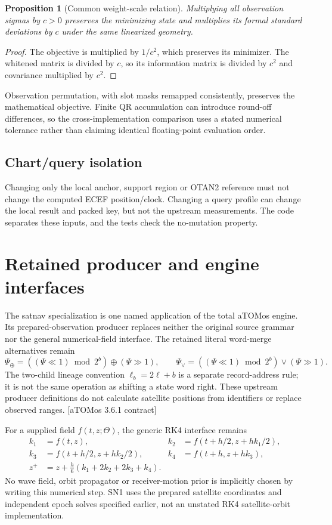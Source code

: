 \documentclass[11pt,a4paper]{article}
\newcommand{\aRef}{\textcolor{muted}{[aTOMos 3.6.1 contract]}}
\newtheorem{proposition}{Proposition}[section]
\begin{document}
\begin{proposition}[Common weight-scale relation]
Multiplying all observation sigmas by $c>0$ preserves the minimizing state and multiplies its formal
standard deviations by $c$ under the same linearized geometry.
\end{proposition}
\begin{proof}
The objective is multiplied by $1/c^2$, which preserves its minimizer. The whitened matrix is divided by
$c$, so its information matrix is divided by $c^2$ and covariance multiplied by $c^2$.
\end{proof}

Observation permutation, with slot masks remapped consistently, preserves the mathematical objective.
Finite QR accumulation can introduce round-off differences, so the cross-implementation comparison uses a
stated numerical tolerance rather than claiming identical floating-point evaluation order.

\subsection{Chart/query isolation}
Changing only the local anchor, support region or OTAN2 reference must not change the computed ECEF
position/clock. Changing a query profile can change the local result and packed key, but not the upstream
measurements. The code separates these inputs, and the tests check the no-mutation property.
\clearpage

\section{Retained producer and engine interfaces}
The satnav specialization is one named application of the total aTOMos engine. Its prepared-observation
producer replaces neither the original source grammar nor the general numerical-field interface.
The retained literal word-merge alternatives remain
\begin{equation}
\Psi_\oplus=((\Psi\ll1)\bmod2^b)\oplus(\Psi\gg1),\qquad
\Psi_\lor=((\Psi\ll1)\bmod2^b)\lor(\Psi\gg1).
\end{equation}
The two-child lineage convention $\ell_b=2\ell+b$ is a separate record-address rule; it is not the same
operation as shifting a state word right. These upstream producer definitions do not calculate satellite
positions from identifiers or replace observed ranges. \aRef

For a supplied field $f(t,z;\Theta)$, the generic RK4 interface remains
\begin{align}
k_1&=f(t,z),&k_2&=f(t+h/2,z+hk_1/2),\\
k_3&=f(t+h/2,z+hk_2/2),&k_4&=f(t+h,z+hk_3),\\
z^+&=z+\tfrac h6(k_1+2k_2+2k_3+k_4).&&
\end{align}
No wave field, orbit propagator or receiver-motion prior is implicitly chosen by writing this numerical step.
SN1 uses the prepared satellite coordinates and independent epoch solves specified earlier, not an unstated
RK4 satellite-orbit implementation.
\end{document}
